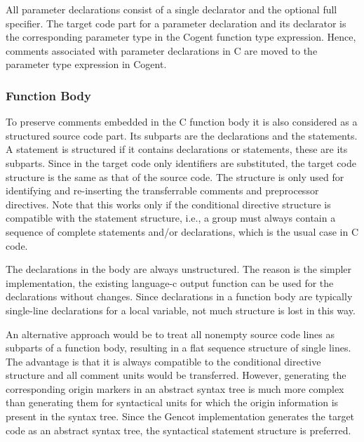 All parameter declarations consist of a single declarator and the optional full specifier. The target code part for
a parameter declaration and its declarator is the corresponding parameter type in the Cogent function type expression.
Hence, comments associated with parameter declarations in C are moved to the parameter type expression in Cogent.

\subsubsection{Function Body}

To preserve comments embedded in the C function body it is also considered as a structured source code part. Its 
subparts are the declarations and the statements. A statement is structured if it contains declarations
or statements, these are its subparts. Since in the target code only identifiers are substituted, the target code
structure is the same as that of the source code. The structure is only used for identifying and re-inserting
the transferrable comments and preprocessor directives. Note that this works only if the conditional directive 
structure is compatible with the statement structure, i.e., a group must always contain a sequence of complete
statements and/or declarations, which is the usual case in C code.

The declarations in the body are always unstructured. The reason is the simpler implementation, the existing language-c 
output function can be used for the declarations without changes. Since declarations in a function body are typically
single-line declarations for a local variable, not much structure is lost in this way. 

An alternative approach would be to treat all nonempty source code lines as subparts of a function body, resulting
in a flat sequence structure of single lines. The advantage is that it is always compatible to the conditional 
directive structure and
all comment units would be transferred. However, generating the corresponding origin markers in an abstract syntax
tree is much more complex than generating them for syntactical units for which the origin information is present
in the syntax tree. Since the Gencot implementation generates the
target code as an abstract syntax tree, the syntactical statement structure is preferred. 

